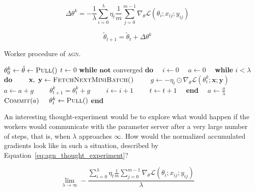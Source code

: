 \documentclass[wcp]{jmlr}
\begin{document}
\begin{equation}
  \label{eq:accumulated_gradient_normalization}
  \Delta\theta^k = -\frac{1}{\lambda}\sum_{i = 0}^\lambda \eta_t \frac{1}{m}\sum_{j = 0}^{m - 1} \nabla_\theta \mathcal{L}(\theta_i;x_{ij};y_{ij})
\end{equation}

\begin{equation}
  \label{eq:agn_ps_update}
  \tilde{\theta}_{t + 1} = \tilde{\theta}_t + \Delta\theta^k
\end{equation}

\begin{algorithm}
  \caption{Worker procedure of \textsc{agn}.}
  \label{algo:agn}
  \begin{algorithmic}[1]
    \State $\theta^k_0 \gets \tilde{\theta} \gets \Call{Pull}$
    \State $t \gets 0$
    \State \textbf{while} {$\textbf{not}$ converged} \textbf{do}
    \State ~~$i \gets 0$
    \State ~~$a \gets 0$
    \State ~~\textbf{while} $i < \lambda$ \textbf{do}
    \State ~~~~$\textbf{x},~\textbf{y} \gets \Call{FetchNextMiniBatch()}{}$
    \State ~~~~$g \gets -\eta_t \odot \nabla_\theta \mathcal{L}(\theta^k_t;\textbf{x};\textbf{y})$ 
    \State ~~~~$a \gets a + g$
    \State ~~~~$\theta^k_{t + 1} = \theta^k_t + g$
    \State ~~~~$i \gets i + 1$
    \State ~~~~$t \gets t + 1$
    \State ~~\textbf{end}
    \State ~~$a \gets \frac{a}{\lambda}$ 
    \State ~~$\Call{Commit}{a}$
    \State ~~$\theta^k_{t} \gets \Call{Pull}$
    \State \textbf{end}
    \EndProcedure
  \end{algorithmic}
\end{algorithm}

An interesting thought-experiment would be to explore what would happen if the workers would communicate with the parameter server after a very large number of steps, that is, when $\lambda$ approaches $\infty$. How would the normalized accumulated gradients look like in such a situation, described by Equation~\ref{eq:agn_thought_experiment}?

\begin{equation}
  \label{eq:agn_thought_experiment}
  \lim_{\lambda \to \infty} -\frac{\sum_{i = 0}^\lambda \eta_t \frac{1}{m}\sum_{j = 0}^{m - 1} \nabla_\theta \mathcal{L}(\theta_i;x_{ij};y_{ij})}{\lambda}
\end{equation}
\end{document}
